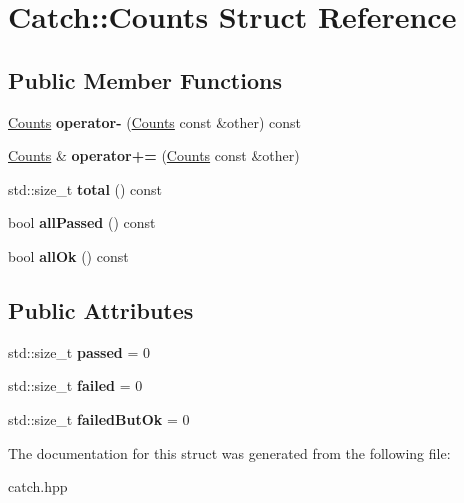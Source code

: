 \hypertarget{structCatch_1_1Counts}{}\section{Catch\+:\+:Counts Struct Reference}
\label{structCatch_1_1Counts}
\subsection*{Public Member Functions}
\begin{DoxyCompactItemize}
\item 
\hyperlink{structCatch_1_1Counts}{Counts} {\bfseries operator-\/} (\hyperlink{structCatch_1_1Counts}{Counts} const \&other) const \hypertarget{structCatch_1_1Counts_aedf86fefe33938d132a6981171cd83e6}{}\label{structCatch_1_1Counts_aedf86fefe33938d132a6981171cd83e6}

\item 
\hyperlink{structCatch_1_1Counts}{Counts} \& {\bfseries operator+=} (\hyperlink{structCatch_1_1Counts}{Counts} const \&other)\hypertarget{structCatch_1_1Counts_a322a89475cd2cc039140ef371e973677}{}\label{structCatch_1_1Counts_a322a89475cd2cc039140ef371e973677}

\item 
std\+::size\+\_\+t {\bfseries total} () const \hypertarget{structCatch_1_1Counts_a9125c662e30114e5c5cc94729b1e9e84}{}\label{structCatch_1_1Counts_a9125c662e30114e5c5cc94729b1e9e84}

\item 
bool {\bfseries all\+Passed} () const \hypertarget{structCatch_1_1Counts_adbbaca552f6017ce69e0d5dc5500bea4}{}\label{structCatch_1_1Counts_adbbaca552f6017ce69e0d5dc5500bea4}

\item 
bool {\bfseries all\+Ok} () const \hypertarget{structCatch_1_1Counts_ab2497c9dfc77be757a90225ea69595f5}{}\label{structCatch_1_1Counts_ab2497c9dfc77be757a90225ea69595f5}

\end{DoxyCompactItemize}
\subsection*{Public Attributes}
\begin{DoxyCompactItemize}
\item 
std\+::size\+\_\+t {\bfseries passed} = 0\hypertarget{structCatch_1_1Counts_ad28daaf3de28006400208b6dd0c631e6}{}\label{structCatch_1_1Counts_ad28daaf3de28006400208b6dd0c631e6}

\item 
std\+::size\+\_\+t {\bfseries failed} = 0\hypertarget{structCatch_1_1Counts_a19982a3817a3bc2c07f0290e71f497a3}{}\label{structCatch_1_1Counts_a19982a3817a3bc2c07f0290e71f497a3}

\item 
std\+::size\+\_\+t {\bfseries failed\+But\+Ok} = 0\hypertarget{structCatch_1_1Counts_ac090973a2ff51394cd452718e75c073e}{}\label{structCatch_1_1Counts_ac090973a2ff51394cd452718e75c073e}

\end{DoxyCompactItemize}


The documentation for this struct was generated from the following file\+:\begin{DoxyCompactItemize}
\item 
catch.\+hpp\end{DoxyCompactItemize}
